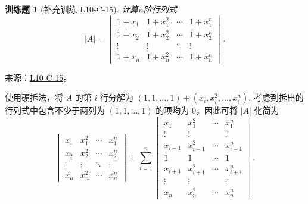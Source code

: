 \documentclass[12pt,fontset=fandol]{ctexart}
\newtheorem{exercise}{训练题}[section]
\begin{document}
\begin{exercise}[补充训练 L10-C-15]\label{prob:L10-C-15}
计算$n$阶行列式
        \[|A|=\begin{vmatrix}
                1+x_1  & 1+x_1^2 & \cdots & 1+x_1^n \\
                1+x_2  & 1+x_2^2 & \cdots & 1+x_2^n \\
                \vdots & \vdots  & \ddots & \vdots  \\
                1+x_n  & 1+x_n^2 & \cdots & 1+x_n^n
            \end{vmatrix}.\]
\end{exercise}
\noindent 来源：\href{https://github.com/yhwu-is/Linear-Algebra-Left-Undone/blob/new/%E8%AE%B2%E4%B9%89/%E4%B8%93%E9%A2%98/10%20%E8%A1%8C%E5%88%97%E5%BC%8F.tex}{L10-C-15}。
\begin{solve}
使用硬拆法，将 $A$ 的第 $i$ 行分解为 $(1, 1, \ldots, 1) + (x_i, x_i^2, \ldots, x_i^n)$. 考虑到拆出的行列式中包含不少于两列为 $(1, 1, \ldots, 1)$ 的项均为 $0$，因此可将 $|A|$ 化简为
            \[
                \begin{vmatrix}
                    x_1    & x_1^2  & \cdots & x_1^n  \\
                    x_2    & x_2^2  & \cdots & x_2^n  \\
                    \vdots & \vdots & \ddots & \vdots \\
                    x_n    & x_n^2  & \cdots & x_n^n
                \end{vmatrix} + \sum_{i=1}^n \begin{vmatrix}
                    x_1     & x_1^2     & \cdots & x_1^n     \\
                    \vdots  & \vdots    &        & \vdots    \\
                    x_{i-1} & x_{i-1}^2 & \cdots & x_{i-1}^n \\
                    1       & 1         & \cdots & 1         \\
                    x_{i+1} & x_{i+1}^2 & \cdots & x_{i+1}^n \\
                    \vdots  & \vdots    &        & \vdots    \\
                    x_n     & x_n^2     & \cdots & x_n^n
                \end{vmatrix}.
            \]


\end{solve}
\end{document}
